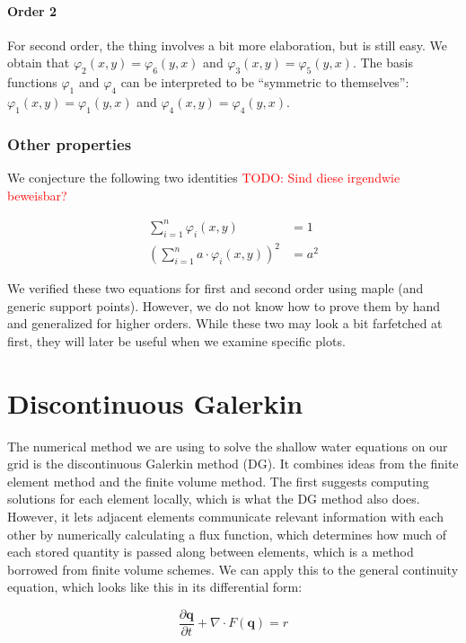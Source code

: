 \documentclass{article}
\newcommand{\todo}[1]{\textcolor{red}{TODO: #1}}
\newcommand{\pd}[2]{\dfrac{\partial #1}{\partial #2}}
\renewcommand{\phi}{\varphi}
\begin{document}
\paragraph{Order 2}

For second order, the thing involves a bit more elaboration, but is still easy. We obtain that $\phi_2(x,y)=\phi_6(y,x)$ and $\phi_3(x,y)=\phi_5(y,x)$. The basis functions $\phi_1$ and $\phi_4$ can be interpreted to be ``symmetric to themselves'': $\phi_1(x,y)=\phi_1(y,x)$ and $\phi_4(x,y)=\phi_4(y,x)$.

\subsubsection{Other properties}
\label{sec:basis-functions-other-properties}

We conjecture the following two identities \todo{Sind diese irgendwie beweisbar?}

\begin{align}
  \sum_{i=1}^n \phi_i(x,y) &= 1 \\
  \left( \sum_{i=1}^n a \cdot \phi_i(x,y) \right)^2 &= a^2 
\end{align}

We verified these two equations for first and second order using maple (and generic support points). However, we do not know how to prove them by hand and generalized for higher orders. While these two may look a bit farfetched at first, they will later be useful when we examine specific plots.

\section{Discontinuous Galerkin}
\label{sec:discontinuous-galerkin}

The numerical method we are using to solve the shallow water equations on our grid is the discontinuous Galerkin method (DG). It combines ideas from the finite element method and the finite volume method. The first suggests computing solutions for each element locally, which is what the DG method also does. However, it lets adjacent elements communicate relevant information with each other by numerically calculating a flux function, which determines how much of each stored quantity is passed along between elements, which is a method borrowed from finite volume schemes. We can apply this to the general continuity equation, which looks like this in its differential form:

\begin{equation}
  \label{eq:general-continuity-equation}
  \pd{\mathbf{q}}{t} + \nabla \cdot F(\mathbf{q}) = r
\end{equation}
\end{document}
